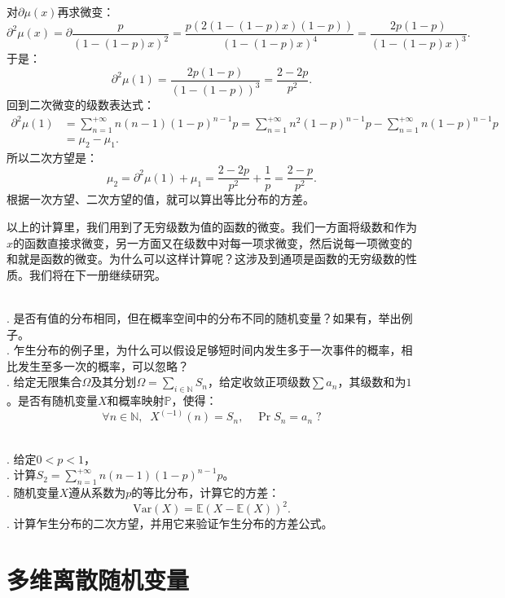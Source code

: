 \documentclass[12pt,UTF8]{ctexbook}
\begin{document}
对$\partial \mu(x)$再求微变：
\[
    \partial^2 \mu(x) = \partial \frac{p}{(1 - (1 - p)x)^2} = \frac{p(2(1 - (1 - p)x)(1 - p))}{(1 - (1 - p)x)^4} = \frac{2p(1 - p)}{(1 - (1 - p)x)^3}.
\]
于是：
$$ \partial^2 \mu(1) = \frac{2p(1 - p)}{(1 - (1 - p))^3} = \frac{2 - 2p}{p^2}. $$
回到二次微变的级数表达式：
\begin{align*}
    \partial^2 \mu(1) &= \sum_{n=1}^{+\infty} n(n - 1) (1 - p)^{n-1} p = \sum_{n=1}^{+\infty} n^2 (1 - p)^{n-1} p - \sum_{n=1}^{+\infty} n (1 - p)^{n-1} p \\
    &= \mu_2 - \mu_1.
\end{align*}
所以二次方望是：
\[
\mu_2 = \partial^2 \mu(1) + \mu_1 = \frac{2 - 2p}{p^2} + \frac{1}{p} = \frac{2 - p}{p^2}.
\]
根据一次方望、二次方望的值，就可以算出等比分布的方差。

以上的计算里，我们用到了无穷级数为值的函数的微变。我们一方面将级数和作为$x$的函数直接求微变，另一方面又在级数中对每一项求微变，然后说每一项微变的和就是函数的微变。为什么可以这样计算呢？这涉及到通项是函数的无穷级数的性质。我们将在下一册继续研究。

\begin{sk}
    \mbox{} \\
    . 是否有值的分布相同，但在概率空间中的分布不同的随机变量？如果有，举出例子。\\
    . 乍生分布的例子里，为什么可以假设足够短时间内发生多于一次事件的概率，相比发生至多一次的概率，可以忽略？\\
    . 给定无限集合$\Omega$及其分划$\Omega = \sum_{i\in\mathbb{N}} S_n$，给定收敛正项级数$\sum a_n$，其级数和为$1$。是否有随机变量$X$和概率映射$\mathbb{P}$，使得：
    $$ \forall n\in\mathbb{N}, \;\; X^{(-1)} (n) = S_n, \quad \Pr{S_n} = a_n \; ?$$
\end{sk}

\begin{xt}
    \mbox{} \\
    . 给定$0<p<1$，\\
    . 计算$S_2 = \sum_{n=1}^{+\infty} n(n - 1)(1 - p)^{n-1} p$。\\
    . 随机变量$X$遵从系数为$p$的等比分布，计算它的方差：
    $$ \mathrm{Var}(X) = \mathbb{E}(X - \mathbb{E}(X))^2.$$
    . 计算乍生分布的二次方望，并用它来验证乍生分布的方差公式。 \\
\end{xt}

\section{多维离散随机变量}
\end{document}
